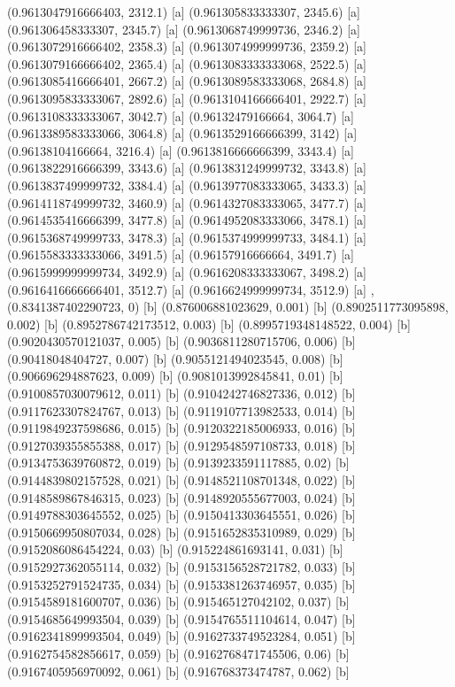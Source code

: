 {{{(0.9613047916666403, 2312.1) [a] 
(0.961305833333307, 2345.6) [a] 
(0.961306458333307, 2345.7) [a] 
(0.9613068749999736, 2346.2) [a] 
(0.9613072916666402, 2358.3) [a] 
(0.9613074999999736, 2359.2) [a] 
(0.9613079166666402, 2365.4) [a] 
(0.9613083333333068, 2522.5) [a] 
(0.9613085416666401, 2667.2) [a] 
(0.9613089583333068, 2684.8) [a] 
(0.9613095833333067, 2892.6) [a] 
(0.9613104166666401, 2922.7) [a] 
(0.9613108333333067, 3042.7) [a] 
(0.96132479166664, 3064.7) [a] 
(0.9613389583333066, 3064.8) [a] 
(0.9613529166666399, 3142) [a] 
(0.96138104166664, 3216.4) [a] 
(0.9613816666666399, 3343.4) [a] 
(0.9613822916666399, 3343.6) [a] 
(0.9613831249999732, 3343.8) [a] 
(0.9613837499999732, 3384.4) [a] 
(0.9613977083333065, 3433.3) [a] 
(0.9614118749999732, 3460.9) [a] 
(0.9614327083333065, 3477.7) [a] 
(0.9614535416666399, 3477.8) [a] 
(0.9614952083333066, 3478.1) [a] 
(0.9615368749999733, 3478.3) [a] 
(0.9615374999999733, 3484.1) [a] 
(0.9615583333333066, 3491.5) [a] 
(0.96157916666664, 3491.7) [a] 
(0.9615999999999734, 3492.9) [a] 
(0.9616208333333067, 3498.2) [a] 
(0.9616416666666401, 3512.7) [a] 
(0.9616624999999734, 3512.9) [a] 
},{(0.8341387402290723, 0) [b] 
(0.876006881023629, 0.001) [b] 
(0.8902511773095898, 0.002) [b] 
(0.8952786742173512, 0.003) [b] 
(0.8995719348148522, 0.004) [b] 
(0.9020430570121037, 0.005) [b] 
(0.9036811280715706, 0.006) [b] 
(0.90418048404727, 0.007) [b] 
(0.9055121494023545, 0.008) [b] 
(0.906696294887623, 0.009) [b] 
(0.9081013992845841, 0.01) [b] 
(0.9100857030079612, 0.011) [b] 
(0.9104242746827336, 0.012) [b] 
(0.9117623307824767, 0.013) [b] 
(0.9119107713982533, 0.014) [b] 
(0.9119849237598686, 0.015) [b] 
(0.9120322185006933, 0.016) [b] 
(0.9127039355855388, 0.017) [b] 
(0.9129548597108733, 0.018) [b] 
(0.9134753639760872, 0.019) [b] 
(0.9139233591117885, 0.02) [b] 
(0.9144839802157528, 0.021) [b] 
(0.9148521108701348, 0.022) [b] 
(0.9148589867846315, 0.023) [b] 
(0.9148920555677003, 0.024) [b] 
(0.9149788303645552, 0.025) [b] 
(0.9150413303645551, 0.026) [b] 
(0.9150669950807034, 0.028) [b] 
(0.9151652835310989, 0.029) [b] 
(0.9152086086454224, 0.03) [b] 
(0.915224861693141, 0.031) [b] 
(0.9152927362055114, 0.032) [b] 
(0.9153156528721782, 0.033) [b] 
(0.9153252791524735, 0.034) [b] 
(0.9153381263746957, 0.035) [b] 
(0.9154589181600707, 0.036) [b] 
(0.915465127042102, 0.037) [b] 
(0.9154685649993504, 0.039) [b] 
(0.9154765511104614, 0.047) [b] 
(0.9162341899993504, 0.049) [b] 
(0.9162733749523284, 0.051) [b] 
(0.9162754582856617, 0.059) [b] 
(0.9162768471745506, 0.06) [b] 
(0.9167405956970092, 0.061) [b] 
(0.916768373474787, 0.062) [b] 
}}}
